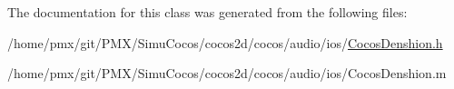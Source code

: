 The documentation for this class was generated from the following files\+:\begin{DoxyCompactItemize}
\item 
/home/pmx/git/\+P\+M\+X/\+Simu\+Cocos/cocos2d/cocos/audio/ios/\hyperlink{cocos2d_2cocos_2audio_2ios_2CocosDenshion_8h}{Cocos\+Denshion.\+h}\item 
/home/pmx/git/\+P\+M\+X/\+Simu\+Cocos/cocos2d/cocos/audio/ios/Cocos\+Denshion.\+m\end{DoxyCompactItemize}
